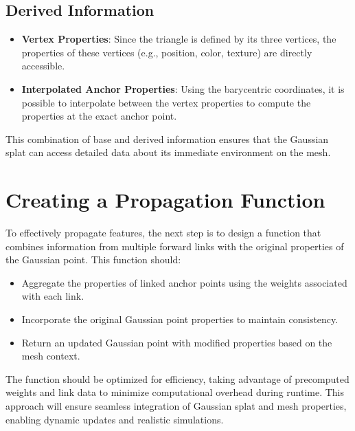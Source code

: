 \subsection*{Derived Information}
\begin{itemize}
    \item \textbf{Vertex Properties}: Since the triangle is defined by its three vertices, the properties of these vertices (e.g., position, color, texture) are directly accessible.
    \item \textbf{Interpolated Anchor Properties}: Using the barycentric coordinates, it is possible to interpolate between the vertex properties to compute the properties at the exact anchor point.
\end{itemize}

This combination of base and derived information ensures that the Gaussian splat can access detailed data about its immediate environment on the mesh.

\section{Creating a Propagation Function}

To effectively propagate features, the next step is to design a function that combines information from multiple forward links with the original properties of the Gaussian point. This function should:

\begin{itemize}
    \item Aggregate the properties of linked anchor points using the weights associated with each link.
    \item Incorporate the original Gaussian point properties to maintain consistency.
    \item Return an updated Gaussian point with modified properties based on the mesh context.
\end{itemize}

The function should be optimized for efficiency, taking advantage of precomputed weights and link data to minimize computational overhead during runtime. This approach will ensure seamless integration of Gaussian splat and mesh properties, enabling dynamic updates and realistic simulations.
